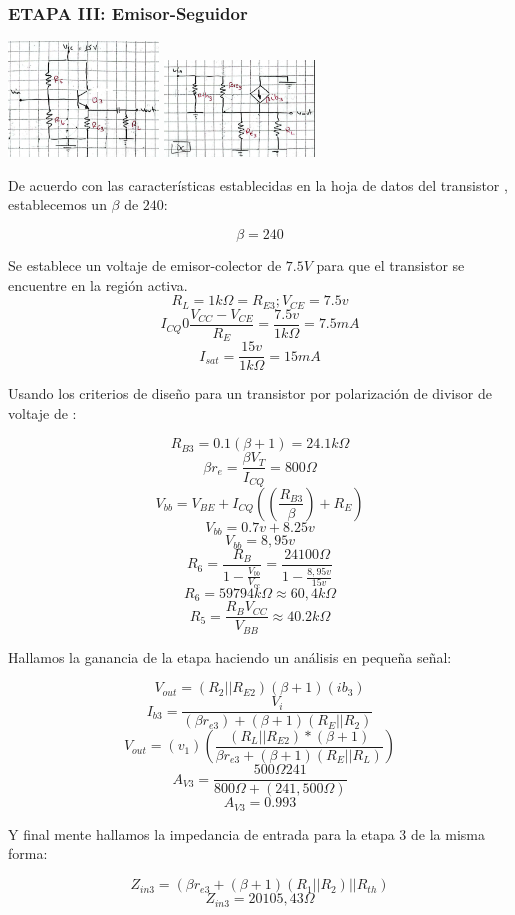 \documentclass[conference]{IEEEtran}
\begin{document}
\subsubsection{ETAPA III: Emisor-Seguidor}


\includegraphics[width=4cm]{imagenes/etapa3.PNG}
\includegraphics[width=4cm]{imagenes/etapa3.1.PNG}
\begin{center}
De acuerdo con las características establecidas en la hoja de datos del transistor \cite{Q2N2222A}, establecemos un $\beta$ de $240$:

\[\beta = 240\]

Se establece un voltaje de emisor-colector de $7.5V$ para que el transistor se encuentre en la región activa.
\[ 
R_{L} = 1k\Omega = R_{E3}; V_{CE} = 7.5v\]
\[I_{CQ} 0 \frac{V_{CC}-V_{CE}}{R_{E}}=\frac{7.5v}{1k\Omega} = 7.5mA \]
\[I_{sat}= \frac{15v}{1k\Omega} = 15mA \]

Usando los criterios de diseño para un transistor por polarización de divisor de voltaje de \cite{neamen2009microelectronics}:

\[R_{B3} = 0.1(\beta +1)=24.1k\Omega\]
\[\beta r_{e} = \frac{\beta V_{T}}{I_{CQ}}=800\Omega \]
\[V_{bb} = V_{BE}+ I_{CQ}((\frac{R_{B3}}{\beta})+R_{E}) \]
\[V_{bb} = 0.7v + 8.25v \]
\[V_{bb}= 8,95v \]
\[R_{6} = \frac{R_{B}}{1-\frac{V_{bb}}{V_{cc}}} = \frac{24100\Omega}{1-\frac{8,95v}{15v}} \]
\[R_{6} = 59794k\Omega \approx  60,4k\Omega \]
\[R_{5} =  \frac{R_{B}V_{CC}}{V_{BB}} \approx 40.2k\Omega\]

Hallamos la ganancia de la etapa haciendo un análisis en pequeña señal:

\[V_{out} = (R_{2}||R_{E2})(\beta +1)(ib_{3}) \]
\[I_{b3}= \frac{V_{i}}{(\beta r_{e3})+(\beta + 1)(R_{E} || R_{2})} \]
\[V_{out} = (v_{1})(\frac{(R_{L}||R_{E2})*(\beta+1)}{\beta r_{e3}+(\beta + 1)(R_{E}||R_{L})})\]
\[A_{V3} = \frac{500\Omega 241}{800\Omega + (241,500\Omega)}\]
\[A_{V3}=0.993\]

Y final mente hallamos la impedancia de entrada para la etapa 3 de la misma forma:

\[Z_{in3}=(\beta r_{e3} + (\beta + 1) (R_{1} || R_{2})|| R_{th})\]
\[Z_{in3}=20105,43 \Omega\]
\end{center}
\end{document}
